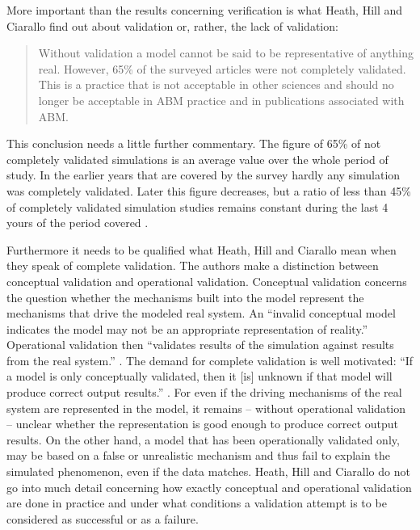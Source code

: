 \documentclass[12pt, english, a4paper]{article}
\begin{document}
More important than the results concerning verification is what Heath,
Hill and Ciarallo find out about validation or, rather, the lack of
validation:

\begin{quote}
  Without validation a model cannot be said to be representative of
  anything real. However, 65\% of the surveyed articles were not
  completely validated.  This is a practice that is not acceptable in
  other sciences and should no longer be acceptable in ABM practice
  and in publications associated with
  ABM. \citep[4.11]{heath-et-al:2009}
\end{quote}

This conclusion needs a little further commentary. The figure of 65\%
of not completely validated simulations is an average value over the
whole period of study. In the earlier years that are covered by the
survey hardly any simulation was completely validated. Later this
figure decreases, but a ratio of less than 45\% of completely
validated simulation studies remains constant during the last 4 yours
of the period covered \citep[3.10]{heath-et-al:2009}.

Furthermore it needs to be qualified what Heath, Hill and Ciarallo
mean when they speak of complete validation.  The authors make a
distinction between conceptual validation and operational validation.
Conceptual validation concerns the question whether the mechanisms
built into the model represent the mechanisms that drive the modeled
real system. An “invalid conceptual model indicates the model may not
be an appropriate representation of reality.” Operational validation
then “validates results of the simulation against results from the
real system.” \citep[2.13]{heath-et-al:2009}. The demand for complete
validation is well motivated: “If a model is only conceptually
validated, then it [is] unknown if that model will produce correct
output results.” \citep[4.12]{heath-et-al:2009}. For even if the
driving mechanisms of the real system are represented in the model, it
remains – without operational validation – unclear whether the
representation is good enough to produce correct output results. On
the other hand, a model that has been operationally validated only,
may be based on a false or unrealistic mechanism and thus fail to
explain the simulated phenomenon, even if the data matches. Heath,
Hill and Ciarallo do not go into much detail concerning how exactly
conceptual and operational validation are done in practice and under
what conditions a validation attempt is to be considered as successful
or as a failure.
\end{document}
